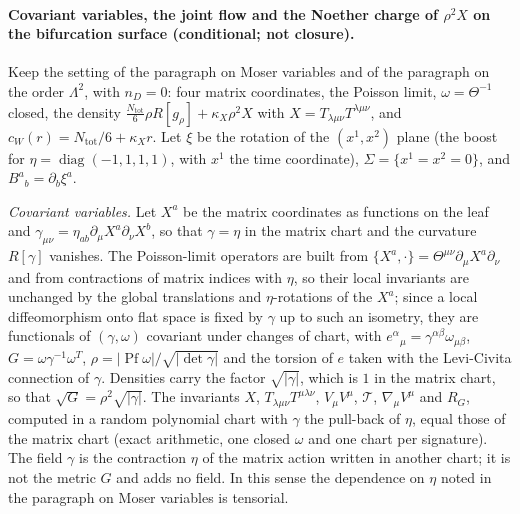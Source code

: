 \paragraph{Covariant variables, the joint flow and the Noether charge of \(\rho^2X\) on the bifurcation surface (conditional; not closure).}
Keep the setting of the paragraph on Moser variables and of the paragraph on the order \(\Lambda^2\), with \(n_D=0\): four matrix coordinates, the Poisson limit, \(\omega=\Theta^{-1}\) closed, the density \(\tfrac{N_{\mathrm{tot}}}6\rho R[g_\rho]+\kappa_X\rho^2X\) with \(X=T_{\lambda\mu\nu}T^{\lambda\mu\nu}\), and \(c_W(r)=N_{\mathrm{tot}}/6+\kappa_Xr\). Let \(\xi\) be the rotation of the \((x^1,x^2)\) plane (the boost for \(\eta=\operatorname{diag}(-1,1,1,1)\), with \(x^1\) the time coordinate), \(\Sigma=\{x^1=x^2=0\}\), and \(B^a{}_b=\partial_b\xi^a\).

\emph{Covariant variables.} Let \(X^a\) be the matrix coordinates as functions on the leaf and \(\gamma_{\mu\nu}=\eta_{ab}\partial_\mu X^a\partial_\nu X^b\), so that \(\gamma=\eta\) in the matrix chart and the curvature \(R[\gamma]\) vanishes. The Poisson-limit operators are built from \(\{X^a,\cdot\}=\Theta^{\mu\nu}\partial_\mu X^a\partial_\nu\) and from contractions of matrix indices with \(\eta\), so their local invariants are unchanged by the global translations and \(\eta\)-rotations of the \(X^a\); since a local diffeomorphism onto flat space is fixed by \(\gamma\) up to such an isometry, they are functionals of \((\gamma,\omega)\) covariant under changes of chart, with \(e^\alpha{}_\mu=\gamma^{\alpha\beta}\omega_{\mu\beta}\), \(G=\omega\gamma^{-1}\omega^T\), \(\rho=\lvert\operatorname{Pf}\omega\rvert/\sqrt{\lvert\det\gamma\rvert}\) and the torsion of \(e\) taken with the Levi-Civita connection of \(\gamma\). Densities carry the factor \(\sqrt{\lvert\gamma\rvert}\), which is \(1\) in the matrix chart, so that \(\sqrt G=\rho^2\sqrt{\lvert\gamma\rvert}\). The invariants \(X\), \(T_{\lambda\mu\nu}T^{\mu\lambda\nu}\), \(V_\mu V^\mu\), \(\mathcal T\), \(\nabla_\mu V^\mu\) and \(R_G\), computed in a random polynomial chart with \(\gamma\) the pull-back of \(\eta\), equal those of the matrix chart (exact arithmetic, one closed \(\omega\) and one chart per signature). The field \(\gamma\) is the contraction \(\eta\) of the matrix action written in another chart; it is not the metric \(G\) and adds no field. In this sense the dependence on \(\eta\) noted in the paragraph on Moser variables is tensorial.

